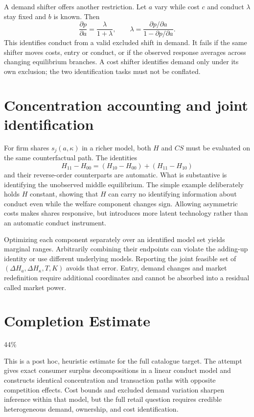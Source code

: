 \documentclass[11pt]{article}
\begin{document}
A demand shifter offers another restriction. Let $a$ vary while cost $c$ and conduct $\lambda$ stay fixed and $b$ is known. Then
\[
 \frac{\partial p}{\partial a}=\frac{\lambda}{1+\lambda},\qquad
 \lambda=\frac{\partial p/\partial a}{1-\partial p/\partial a}.
\]
This identifies conduct from a valid excluded shift in demand. It fails if the same shifter moves costs, entry or conduct, or if the observed response averages across changing equilibrium branches. A cost shifter identifies demand only under its own exclusion; the two identification tasks must not be conflated.

\section{Concentration accounting and joint identification}
For firm shares $s_j(a,\kappa)$ in a richer model, both $H$ and $CS$ must be evaluated on the same counterfactual path. The identities
\[
 H_{11}-H_{00}=(H_{10}-H_{00})+(H_{11}-H_{10})
\]
and their reverse-order counterparts are automatic. What is substantive is identifying the unobserved middle equilibrium. The simple example deliberately holds $H$ constant, showing that $H$ can carry no identifying information about conduct even while the welfare component changes sign. Allowing asymmetric costs makes shares responsive, but introduces more latent technology rather than an automatic conduct instrument.

Optimizing each component separately over an identified model set yields marginal ranges. Arbitrarily combining their endpoints can violate the adding-up identity or use different underlying models. Reporting the joint feasible set of $(\Delta H_a,\Delta H_\kappa,T,K)$ avoids that error. Entry, demand changes and market redefinition require additional coordinates and cannot be absorbed into a residual called market power.

\section{Completion Estimate}
44\%

This is a post hoc, heuristic estimate for the full catalogue target.
The attempt gives exact consumer surplus decompositions in a linear conduct model and constructs identical concentration and transaction paths with opposite competition effects. Cost bounds and excluded demand variation sharpen inference within that model, but the full retail question requires credible heterogeneous demand, ownership, and cost identification.
\end{document}
